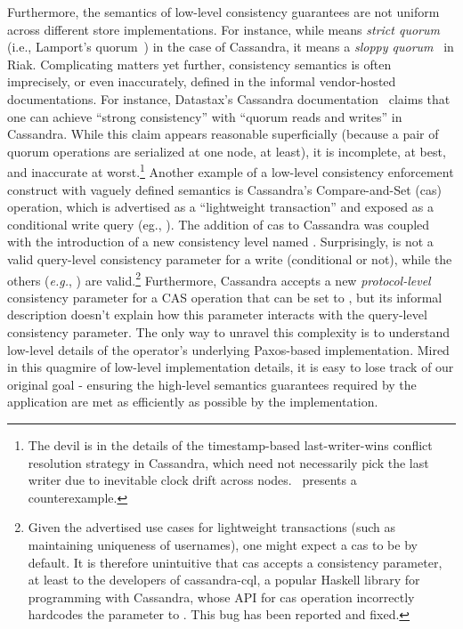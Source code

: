 Furthermore, the semantics of low-level consistency guarantees are not
uniform across different store implementations. For instance, while
 means \emph{strict quorum} (i.e., Lamport's
quorum~\cite{LamportQuorum}) in the case of Cassandra, it means a
\emph{sloppy quorum}~\cite{Dynamo} in Riak. Complicating matters yet
further, consistency semantics is often imprecisely, or even
inaccurately, defined in the informal vendor-hosted documentations.
For instance, Datastax's Cassandra documentation~\cite{dxlwt} claims
that one can achieve ``strong consistency'' with ``quorum reads and
writes'' in Cassandra.  While this claim appears reasonable
superficially (because a pair of quorum operations are serialized at
one node, at least), it is incomplete, at best, and inaccurate at
worst.\footnote{The devil is in the details of the timestamp-based
  last-writer-wins conflict resolution strategy in Cassandra, which
  need not necessarily pick the last writer due to inevitable clock
  drift across nodes.~\cite{JepsenCassandra}
  presents a counterexample.}  Another example
of a low-level consistency enforcement construct with vaguely defined
semantics is Cassandra's Compare-and-Set ({\sc cas}) operation, which
is advertised as a ``lightweight transaction'' and exposed as a
conditional write query (eg., ).  The addition of {\sc cas} to Cassandra was coupled with
the introduction of a new consistency level named .
Surprisingly,  is not a valid query-level consistency
parameter for a write (conditional or not), while the others
(\emph{e.g.}, ) are valid.\footnote{Given the advertised use
  cases for lightweight transactions (such as maintaining uniqueness
  of usernames), one might expect a {\sc cas} to be  by
  default. It is therefore unintuitive that {\sc cas} accepts a
  consistency parameter, at least to the developers of cassandra-cql,
  a popular Haskell library for programming with Cassandra, whose API
  for {\sc cas} operation incorrectly hardcodes the parameter to
  . This bug has been reported and fixed.}  Furthermore,
Cassandra accepts a new \emph{protocol-level} consistency parameter
for a {\sc CAS} operation that can be set to , but its
informal description doesn't explain how this parameter interacts with
the query-level consistency parameter.  The only way to unravel this
complexity is to understand low-level details of the operator's
underlying Paxos-based implementation.  Mired in this quagmire of
low-level implementation details, it is easy to lose track of our
original goal - ensuring the high-level semantics guarantees required
by the application are met as efficiently as possible by the
implementation.

